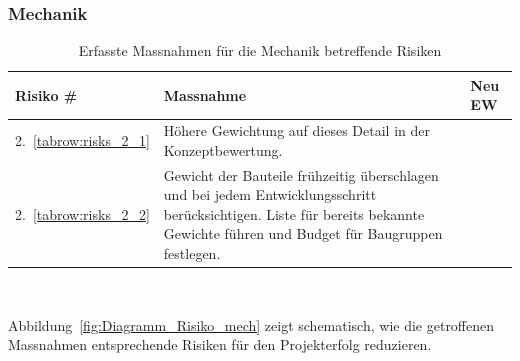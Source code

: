 \documentclass[main.tex]{subfiles} %
\begin{document}

\subsubsection*{Mechanik}

\begin{table}[H]
    \begin{tabularx}{\textwidth}{|>{\centering\arraybackslash}p{2cm}|>{\raggedright\arraybackslash}X|>{\centering\arraybackslash}p{0.75cm}|}
        \hline
        \textbf{Risiko \#}        & \textbf{Massnahme}
                                  & \textbf{Neu EW}                                                                                                                                                                 \\
        \hline
        \rowcolor{yellow!30}
        2.~\ref{tabrow:risks_2_1} & Höhere Gewichtung auf dieses Detail in der Konzeptbewertung.
                                  & 3                                                                                                                                                                               \\
        \hline
        \rowcolor{green!30}
        2.~\ref{tabrow:risks_2_2} & Gewicht der Bauteile frühzeitig überschlagen und bei jedem Entwicklungsschritt berücksichtigen. Liste für bereits bekannte Gewichte führen und Budget für Baugruppen festlegen.
                                  & 1                                                                                                                                                                               \\
        \hline
    \end{tabularx}
    \caption{Erfasste Massnahmen für die Mechanik betreffende Risiken}~\label{tab:Erfasste_Massnahmen_mech}
\end{table}

Abbildung~\ref{fig:Diagramm_Risiko_mech} zeigt schematisch, wie die getroffenen
Massnahmen entsprechende Risiken für den Projekterfolg reduzieren.
\end{document}
